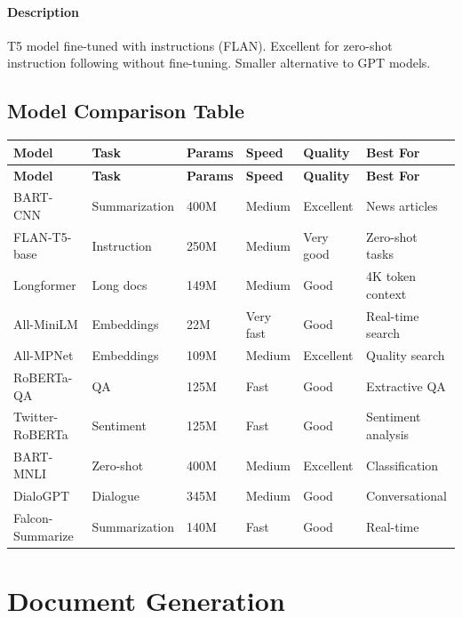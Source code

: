 \documentclass[12pt,a4paper]{report}
\begin{document}
\subsubsection{Description}

T5 model fine-tuned with instructions (FLAN). Excellent for zero-shot instruction following without fine-tuning. Smaller alternative to GPT models.

\section{Model Comparison Table}

\begin{longtable}{|p{2.5cm}|p{2cm}|p{1.5cm}|p{1.5cm}|p{1.5cm}|p{2.5cm}|}
\hline
\textbf{Model} & \textbf{Task} & \textbf{Params} & \textbf{Speed} & \textbf{Quality} & \textbf{Best For} \\
\hline
\endfirsthead
\hline
\textbf{Model} & \textbf{Task} & \textbf{Params} & \textbf{Speed} & \textbf{Quality} & \textbf{Best For} \\
\hline
\endhead
\hline
\endfoot
\hline
\endlastfoot

BART-CNN & Summarization & 400M & Medium & Excellent & News articles \\
\hline
FLAN-T5-base & Instruction & 250M & Medium & Very good & Zero-shot tasks \\
\hline
Longformer & Long docs & 149M & Medium & Good & 4K token context \\
\hline
All-MiniLM & Embeddings & 22M & Very fast & Good & Real-time search \\
\hline
All-MPNet & Embeddings & 109M & Medium & Excellent & Quality search \\
\hline
RoBERTa-QA & QA & 125M & Fast & Good & Extractive QA \\
\hline
Twitter-RoBERTa & Sentiment & 125M & Fast & Good & Sentiment analysis \\
\hline
BART-MNLI & Zero-shot & 400M & Medium & Excellent & Classification \\
\hline
DialoGPT & Dialogue & 345M & Medium & Good & Conversational \\
\hline
Falcon-Summarize & Summarization & 140M & Fast & Good & Real-time \\
\hline
\end{longtable}

\chapter{Document Generation}
\end{document}
